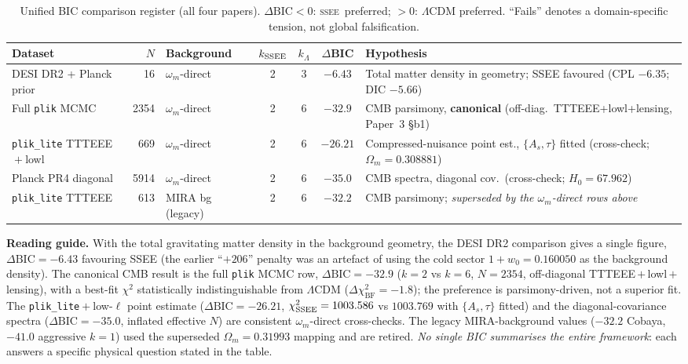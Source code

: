 \documentclass[12pt,a4paper]{article}
\newcommand{\SSEE}{\ifmmode\mathrm{SSEE}\else\textsc{ssee}\fi}
\begin{document}
\begin{table}[H]
\centering
\caption{Unified BIC comparison register (all four papers).
  $\Delta\mathrm{BIC} < 0$: \SSEE\ preferred; $>0$: $\Lambda$CDM preferred.
  ``Fails'' denotes a domain-specific tension, not global falsification.}
\label{tab:bic_unified}
\footnotesize
\begin{tabularx}{\textwidth}{p{2.4cm}rp{1.8cm}cccX}
\toprule
Dataset & $N$ & Background & $k_{\rm SSEE}$ & $k_{\Lambda}$ & $\Delta$BIC & Hypothesis \\
\midrule
DESI DR2 + Planck prior & 16 & $\omega_m$-direct & 2 & 3 & $\mathbf{-6.43}$ &
  Total matter density in geometry; SSEE favoured (CPL $-6.35$; DIC $-5.66$) \\[3pt]
Full \texttt{plik} MCMC & 2354 & $\omega_m$-direct & 2 & 6 & $\mathbf{-32.9}$ &
  CMB parsimony, \textbf{canonical} (off-diag.\ TTTEEE+lowl+lensing, Paper~3 §b1) \\[3pt]
\texttt{plik\_lite} TTTEEE${}+{}$lowl & 669 & $\omega_m$-direct & 2 & 6 & $-26.21$ &
  Compressed-nuisance point est., $\{A_s,\tau\}$ fitted (cross-check; $\Omega_m{=}0.308881$) \\[3pt]
Planck PR4 diagonal & 5914 & $\omega_m$-direct & 2 & 6 & $-35.0$ &
  CMB spectra, diagonal cov.\ (cross-check; $H_0{=}67.962$) \\[3pt]
\texttt{plik\_lite} TTTEEE & 613 & MIRA bg (legacy) & 2 & 6 & $-32.2$ &
  CMB parsimony; \emph{superseded by the $\omega_m$-direct rows above} \\
\bottomrule
\end{tabularx}
\end{table}

\noindent\textbf{Reading guide.}
With the total gravitating matter density in the background geometry, the DESI
DR2 comparison gives a single figure, $\Delta\mathrm{BIC}=-6.43$ favouring SSEE
(the earlier ``$+206$'' penalty was an artefact of using the cold sector
$1+w_0=0.160050$ as the background density).
The canonical CMB result is the full \texttt{plik} MCMC row, $\Delta\mathrm{BIC}=-32.9$
($k=2$ vs $k=6$, $N=2354$, off-diagonal TTTEEE\,$+$\,lowl\,$+$\,lensing), with a
best-fit $\chi^2$ statistically indistinguishable from $\Lambda$CDM
($\Delta\chi^2_\mathrm{BF}=-1.8$); the preference is parsimony-driven, not a
superior fit. The \texttt{plik\_lite}${}+{}$low-$\ell$ point estimate ($\Delta\mathrm{BIC}=-26.21$,
$\chi^2_{\rm SSEE}=1003.586$ vs $1003.769$ with $\{A_s,\tau\}$ fitted) and the diagonal-covariance spectra
($\Delta\mathrm{BIC}=-35.0$, inflated effective $N$) are consistent
$\omega_m$-direct cross-checks. The legacy MIRA-background values
($-32.2$ Cobaya, $-41.0$ aggressive $k{=}1$) used the superseded
$\Omega_m=0.31993$ mapping and are retired.
\emph{No single BIC summarises the entire framework}: each answers a specific
physical question stated in the table.
\end{document}
